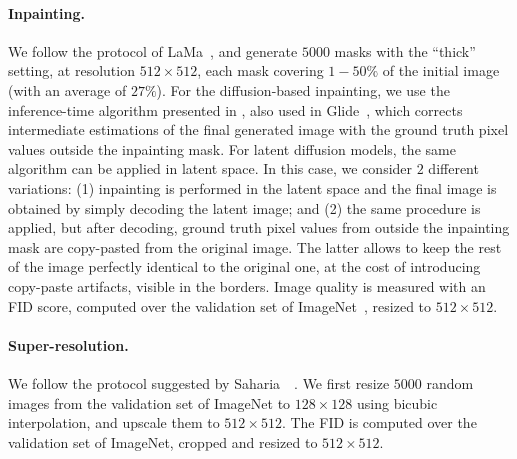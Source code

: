 \paragraph*{Inpainting.}
We follow the protocol of LaMa~\citep{suvorov2022resolution}, and generate $5000$ masks with the ``thick'' setting, at resolution $512\times 512$, each mask covering $1-50\%$ of the initial image (with an average of $27\%$).
For the diffusion-based inpainting, we use the inference-time algorithm presented in \citep{song2020score}, also used in Glide~\citep{nichol2021glide}, which corrects intermediate estimations of the final generated image with the ground truth pixel values outside the inpainting mask. 
For latent diffusion models, the same algorithm can be applied in latent space. 
In this case, we consider $2$ different variations: (1) inpainting is performed in the latent space and the final image is obtained by simply decoding the latent image; and (2) the same procedure is applied, but after decoding, ground truth pixel values from outside the inpainting mask are copy-pasted from the original image. 
The latter allows to keep the rest of the image perfectly identical to the original one, at the cost of introducing copy-paste artifacts, visible in the borders. 
Image quality is measured with an FID score, computed over the validation set of ImageNet~\citep{deng2009imagenet}, resized to $512\times 512$.

\paragraph*{Super-resolution.}
We follow the protocol suggested by Saharia~\etal~\citep{saharia2022image}.
We first resize $5000$ random images from the validation set of ImageNet to $128\times 128$ using bicubic interpolation, and upscale them to $512\times 512$.
The FID is computed over the validation set of ImageNet, cropped and resized to $512\times 512$.






